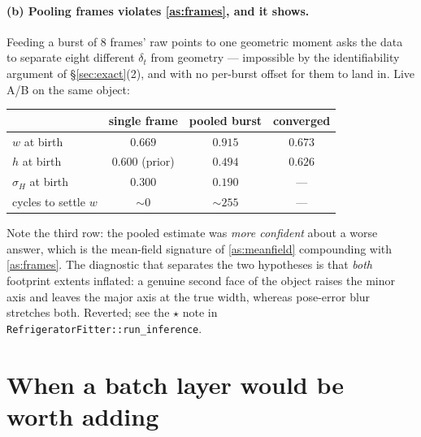 \documentclass[11pt,a4paper]{report}
\theoremstyle{definition}   %
\begin{document}
\paragraph{(b) Pooling frames violates \ref{as:frames}, and it shows.}
Feeding a burst of $8$ frames' raw points to one geometric moment asks the data to separate eight
different $\delta_t$ from geometry --- impossible by the identifiability argument of \S\ref{sec:exact}(2), and with no per-burst
offset for them to land in. Live A/B on the same object:

\begin{center}
\begin{tabular}{@{}lccc@{}}
\toprule
& single frame & pooled burst & converged \\
\midrule
$w$ at birth        & $0.669$ & $\mathbf{0.915}$ & $0.673$ \\
$h$ at birth        & $0.600$ (prior) & $\mathbf{0.494}$ & $0.626$ \\
$\sigma_H$ at birth & $0.300$ & $0.190$ & --- \\
cycles to settle $w$ & $\sim 0$ & $\sim 255$ & --- \\
\bottomrule
\end{tabular}
\end{center}

\noindent
Note the third row: the pooled estimate was \emph{more confident} about a worse answer, which is
the mean-field signature of \ref{as:meanfield} compounding with \ref{as:frames}. The diagnostic
that separates the two hypotheses is that \emph{both} footprint extents inflated: a genuine
second face of the object raises the minor axis and leaves the major axis at the true width,
whereas pose-error blur stretches both. Reverted; see the $\star$ note in
\texttt{RefrigeratorFitter::run\_inference}.

\section{When a batch layer would be worth adding}
\label{sec:batch}
\end{document}
